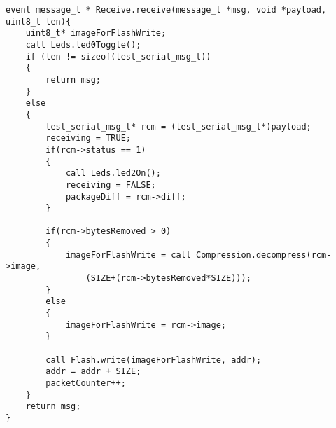 \begin{lstlisting}[label=lst:receive, caption=Receive function in TestSerialC.nc]
event message_t * Receive.receive(message_t *msg, void *payload,
uint8_t len){
	uint8_t* imageForFlashWrite;
	call Leds.led0Toggle();
	if (len != sizeof(test_serial_msg_t)) 
	{
		return msg;
	}
	else 
	{ 	     
		test_serial_msg_t* rcm = (test_serial_msg_t*)payload;
		receiving = TRUE;
		if(rcm->status == 1)
		{
			call Leds.led2On();			
			receiving = FALSE;
			packageDiff = rcm->diff;
		}
		
		if(rcm->bytesRemoved > 0)
		{
			imageForFlashWrite = call Compression.decompress(rcm->image,
				(SIZE+(rcm->bytesRemoved*SIZE)));
		}
		else
		{
			imageForFlashWrite = rcm->image;
		}
		
		call Flash.write(imageForFlashWrite, addr);
		addr = addr + SIZE;
		packetCounter++;
	}
	return msg;
}
\end{lstlisting}